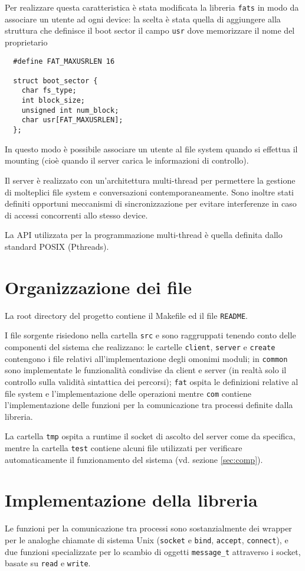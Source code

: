 \documentclass[11pt,oneside,a4paper]{article}
\begin{document}
Per realizzare questa caratteristica è stata modificata la libreria \texttt{fats} in modo da associare un utente ad ogni device: la scelta è stata quella di aggiungere alla struttura che definisce il boot sector il campo \texttt{usr} dove memorizzare il nome del proprietario
\begin{verbatim}
  #define FAT_MAXUSRLEN 16

  struct boot_sector {
    char fs_type;
    int block_size;
    unsigned int num_block;
    char usr[FAT_MAXUSRLEN];
  };
\end{verbatim}
In questo modo è possibile associare un utente al file system quando si effettua il mounting (cioè quando il server carica le informazioni di controllo).

Il server è realizzato con un'architettura multi-thread per permettere la gestione di molteplici file system e conversazioni contemporaneamente. Sono inoltre stati definiti opportuni meccanismi di sincronizzazione per evitare interferenze in caso di accessi concorrenti allo stesso device.

La API utilizzata per la programmazione multi-thread è quella definita dallo standard POSIX (Pthreads).

\section{Organizzazione dei file}
\label{sec:files}
La root directory del progetto contiene il Makefile ed il file \texttt{README}.

I file sorgente risiedono nella cartella \texttt{src} e sono raggruppati tenendo conto delle componenti del sistema che realizzano: le cartelle \texttt{client}, \texttt{server} e \texttt{create} contengono i file relativi all'implementazione degli omonimi moduli; in \texttt{common} sono implementate le funzionalità condivise da client e server (in realtà solo il controllo sulla validità sintattica dei percorsi); \texttt{fat} ospita le definizioni relative al file system e l'implementazione delle operazioni mentre \texttt{com} contiene l'implementazione delle funzioni per la comunicazione tra processi definite dalla libreria.

La cartella \texttt{tmp} ospita a runtime il socket di ascolto del server come da specifica, mentre la cartella \texttt{test} contiene alcuni file utilizzati per verificare automaticamente il funzionamento del sistema (vd. sezione \ref{sec:comp}).

\section{Implementazione della libreria}
\label{sec:lib}
Le funzioni per la comunicazione tra processi sono sostanzialmente dei wrapper per le analoghe chiamate di sistema Unix (\texttt{socket} e \texttt{bind}, \texttt{accept}, \texttt{connect}), e due funzioni specializzate per lo scambio di oggetti \texttt{message\_t} attraverso i socket, basate su \texttt{read} e \texttt{write}.
\end{document}
